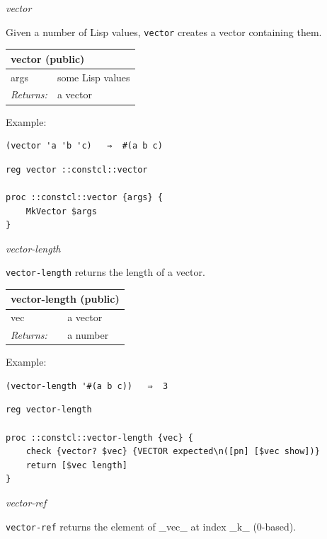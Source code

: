\documentclass[twoside,9pt]{report}
\begin{document}
\emph{vector}


Given a number of Lisp values, \texttt{vector} creates a vector containing them.

\begin{tabular}{ |l l| }
\hline
\multicolumn{2}{|l|}{vector (public)} \\
\hline
args & some Lisp values \\
\textit{Returns:} & a vector \\
\hline
\end{tabular}


Example:

\noindent\makebox[\linewidth]{\rule{\linewidth}{0.4pt}}
\begin{lstlisting}
(vector 'a 'b 'c)   ⇒  #(a b c)
\end{lstlisting}
\noindent\makebox[\linewidth]{\rule{\linewidth}{0.4pt}}
\noindent\makebox[\linewidth]{\rule{\linewidth}{0.4pt}}
\begin{lstlisting}
reg vector ::constcl::vector
 
proc ::constcl::vector {args} {
    MkVector $args
}
\end{lstlisting}
\noindent\makebox[\linewidth]{\rule{\linewidth}{0.4pt}}

\emph{vector-length}


\texttt{vector-length} returns the length of a vector.

\begin{tabular}{ |l l| }
\hline
\multicolumn{2}{|l|}{vector-length (public)} \\
\hline
vec & a vector \\
\textit{Returns:} & a number \\
\hline
\end{tabular}


Example:

\noindent\makebox[\linewidth]{\rule{\linewidth}{0.4pt}}
\begin{lstlisting}
(vector-length '#(a b c))   ⇒  3
\end{lstlisting}
\noindent\makebox[\linewidth]{\rule{\linewidth}{0.4pt}}
\noindent\makebox[\linewidth]{\rule{\linewidth}{0.4pt}}
\begin{lstlisting}
reg vector-length
 
proc ::constcl::vector-length {vec} {
    check {vector? $vec} {VECTOR expected\n([pn] [$vec show])}
    return [$vec length]
}
\end{lstlisting}
\noindent\makebox[\linewidth]{\rule{\linewidth}{0.4pt}}

\emph{vector-ref}


\texttt{vector-ref} returns the element of \_vec\_ at index \_k\_ (0-based).
\end{document}
